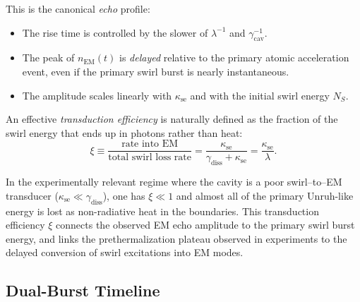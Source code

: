 \documentclass[10pt,reprint,aps,onecolumn,nofootinbib]{revtex4-2}
\begin{document}
        This is the canonical \emph{echo} profile:

        \begin{itemize}
            \item The rise time is controlled by the slower of
            $\lambda^{-1}$ and $\gamma_{\mathrm{cav}}^{-1}$.
            \item The peak of $n_{\mathrm{EM}}(t)$ is \emph{delayed} relative to the
            primary atomic acceleration event, even if the primary
            swirl burst is nearly instantaneous.
            \item The amplitude scales linearly with $\kappa_{\text{se}}$ and with the
            initial swirl energy $N_S$.
        \end{itemize}

        An effective \emph{transduction efficiency} is naturally defined as the
        fraction of the swirl energy that ends up in photons rather than heat:
        \begin{equation}
            \xi
            \equiv
            \frac{\text{rate into EM}}{\text{total swirl loss rate}}
            =
            \frac{\kappa_{\text{se}}}{\gamma_{\mathrm{diss}} + \kappa_{\text{se}}}
            =
            \frac{\kappa_{\text{se}}}{\lambda}.
            \label{eq:xi_definition}
        \end{equation}

        In the experimentally relevant regime where the cavity is a poor
        swirl--to--EM transducer ($\kappa_{\text{se}} \ll \gamma_{\mathrm{diss}}$), one has
        $\xi \ll 1$ and almost all of the primary Unruh-like energy is lost as
        non-radiative heat in the boundaries. This transduction efficiency $\xi$
        connects the observed EM echo amplitude to the primary swirl burst energy,
        and links the prethermalization plateau observed in experiments
        \cite{Saha2025} to the delayed conversion of swirl excitations into EM modes.


\subsection{Dual-Burst Timeline}
\end{document}
